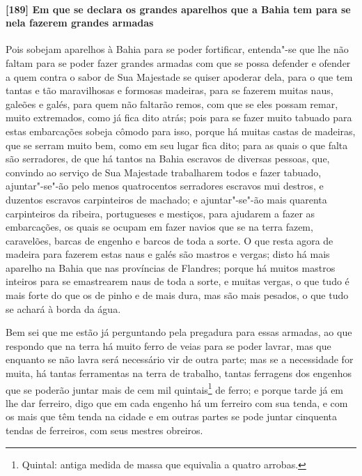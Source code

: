 \paragraph{[189] Em que se declara os grandes aparelhos que a Bahia tem para se nela fazerem
grandes armadas}\quad
Pois sobejam aparelhos à Bahia para se poder fortificar, entenda"-se que lhe não faltam
para se poder fazer grandes armadas com que se possa defender e ofender a quem contra o
sabor de Sua Majestade se quiser apoderar dela, para o que tem tantas e tão maravilhosas e
formosas madeiras, para se fazerem muitas naus, galeões e galés, para quem não faltarão
remos, com que se eles possam remar, muito extremados, como já fica dito atrás; pois para
se fazer muito tabuado para estas embarcações sobeja cômodo para isso, porque há muitas
castas de madeiras, que se serram muito bem, como em seu lugar fica dito; para as quais o
que falta são serradores, de que há tantos na Bahia escravos de diversas pessoas, que,
convindo ao serviço de Sua Majestade trabalharem todos e fazer tabuado, ajuntar"-se"-ão pelo
menos quatrocentos serradores escravos mui destros, e duzentos escravos carpinteiros de
machado; e ajuntar"-se"-ão mais quarenta carpinteiros da ribeira, portugueses e mestiços,
para ajudarem a fazer as embarcações, os quais se ocupam em fazer navios que se na terra
fazem, caravelões, barcas de engenho e barcos de toda a sorte. O que resta agora de
madeira para fazerem estas naus e galés são mastros e vergas; disto há mais aparelho na
Bahia que nas províncias de Flandres; porque há muitos mastros inteiros para se
emastrearem naus de toda a sorte, e muitas vergas, o que tudo é mais forte do que os de
pinho e de mais dura, mas são mais pesados, o que tudo se achará à borda da água.

Bem sei que me estão já perguntando pela pregadura para essas armadas, ao que respondo que
na terra há muito ferro de veias para se poder lavrar, mas que enquanto se não lavra será
necessário vir de outra parte; mas se a necessidade for muita, há tantas ferramentas na
terra de trabalho, tantas ferragens dos engenhos que se poderão juntar mais de cem mil
quintais\footnote{ Quintal: antiga medida de massa que equivalia a quatro arrobas.} de ferro; e
porque tarde já em lhe dar ferreiro, digo que em cada engenho há um ferreiro com sua
tenda, e com os mais que têm tenda na cidade e em outras partes se pode juntar cinquenta
tendas de ferreiros, com seus mestres obreiros.

